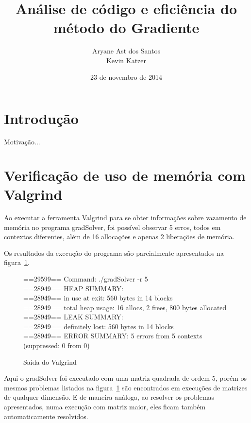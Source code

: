 \documentclass[12pt]{article}
\begin{document}
\setlength{\parskip}{0.2cm}

\title{Análise de código e eficiência do método do Gradiente}

\author{Aryane Ast dos Santos\\ Kevin Katzer}

\date{23 de novembro de 2014}

\maketitle

\tableofcontents

\pagebreak

\section{Introdução}
Motivação...

\section{Verificação de uso de memória com Valgrind}\label{sec:Valgrind}

Ao executar a ferramenta Valgrind para se obter informações sobre vazamento de
memória no programa gradSolver, foi possível observar 5 erros, todos em
contextos diferentes, além de 16 allocações e apenas 2 liberações de memória.

Os resultados da execução do programa são parcialmente apresentados na
figura~\ref{fig:valgrindOut}.

\begin{figure}[htb]
\begin{tt}\noindent
==29599== Command: ./gradSolver -r 5\\
==28949== HEAP SUMMARY:\\
==28949==     in use at exit: 560 bytes in 14 blocks\\
==28949==   total heap usage: 16 allocs, 2 frees, 800 bytes allocated\\
==28949== LEAK SUMMARY:\\
==28949==    definitely lost: 560 bytes in 14 blocks\\
==28949== ERROR SUMMARY: 5 errors from 5 contexts (suppressed: 0 from 0)
\end{tt}\caption{Saída do Valgrind}\label{fig:valgrindOut}
\end{figure}

Aqui o gradSolver foi executado com uma matriz quadrada de ordem 5, porém os
mesmos problemas listados na figura~\ref{fig:valgrindOut} são encontrados em
execuções de matrizes de qualquer dimensão. E de maneira análoga, ao resolver os
problemas apresentados, numa execução com matriz maior, eles ficam também
automaticamente resolvidos.
\end{document}

